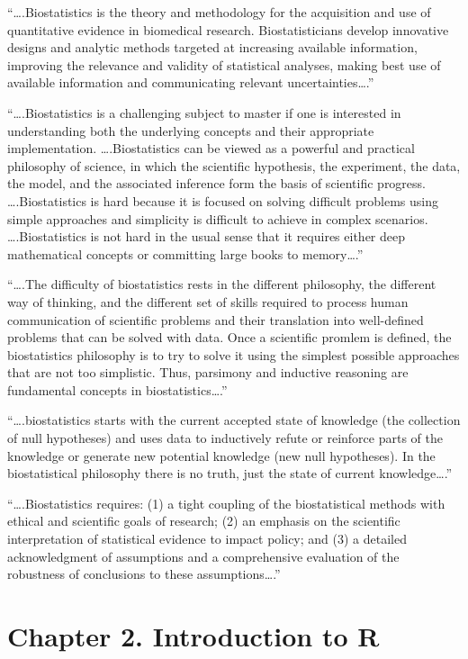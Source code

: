 \documentclass[]{article}
\begin{document}
``\ldots{}.Biostatistics is the theory and methodology for the
acquisition and use of quantitative evidence in biomedical research.
Biostatisticians develop innovative designs and analytic methods
targeted at increasing available information, improving the relevance
and validity of statistical analyses, making best use of available
information and communicating relevant uncertainties\ldots{}.''

``\ldots{}.Biostatistics is a challenging subject to master if one is
interested in understanding both the underlying concepts and their
appropriate implementation. \ldots{}.Biostatistics can be viewed as a
powerful and practical philosophy of science, in which the scientific
hypothesis, the experiment, the data, the model, and the associated
inference form the basis of scientific progress. \ldots{}.Biostatistics
is hard because it is focused on solving difficult problems using simple
approaches and simplicity is difficult to achieve in complex scenarios.
\ldots{}.Biostatistics is not hard in the usual sense that it requires
either deep mathematical concepts or committing large books to
memory\ldots{}.''

``\ldots{}.The difficulty of biostatistics rests in the different
philosophy, the different way of thinking, and the different set of
skills required to process human communication of scientific problems
and their translation into well-defined problems that can be solved with
data. Once a scientific promlem is defined, the biostatistics philosophy
is to try to solve it using the simplest possible approaches that are
not too simplistic. Thus, parsimony and inductive reasoning are
fundamental concepts in biostatistics\ldots{}.''

``\ldots{}.biostatistics starts with the current accepted state of
knowledge (the collection of null hypotheses) and uses data to
inductively refute or reinforce parts of the knowledge or generate new
potential knowledge (new null hypotheses). In the biostatistical
philosophy there is no truth, just the state of current
knowledge\ldots{}.''

``\ldots{}.Biostatistics requires: (1) a tight coupling of the
biostatistical methods with ethical and scientific goals of research;
(2) an emphasis on the scientific interpretation of statistical evidence
to impact policy; and (3) a detailed acknowledgment of assumptions and a
comprehensive evaluation of the robustness of conclusions to these
assumptions\ldots{}.''

\hypertarget{chapter-2.-introduction-to-r}{%
\section{Chapter 2. Introduction to
R}\label{chapter-2.-introduction-to-r}}
\end{document}
